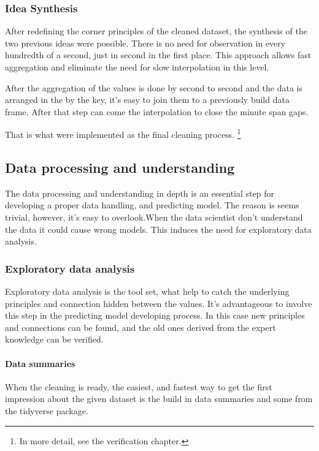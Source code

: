 		\subsubsection{Idea Synthesis}
		After redefining the corner principles of the cleaned dataset, the synthesis of the two previous ideas were possible.
		There is no need for observation in every hundredth of a second, just in second in the first place. This approach allows fast aggregation and eliminate the need for slow interpolation in this level.

		After the aggregation of the values is done by second to second and the data is arranged in the by the key, it's easy to join them to a previously build data frame. After that step can come the interpolation to close the minute span gaps.

		That is what were implemented as the final cleaning process. \footnote{In more detail, see the verification chapter.}
\subsection{Data processing and understanding}
		The data processing and understanding in depth is an essential step for developing a proper data handling, and predicting model.
		The reason is seems trivial, however, it's easy to overlook.When the data scientist don't understand the data it could cause wrong models. This induces the need for exploratory data analysis.
	\subsubsection{Exploratory data analysis}
		Exploratory data analysis is the tool set, what help to catch the underlying principles and connection hidden between the values. It's advantageous to involve this step in the predicting model developing process. In this case new principles and connections can be found, and the old ones derived from the expert knowledge can be verified.
		\paragraph{Data summaries}
		When the cleaning is ready, the easiest, and fastest way to get the first impression about the given dataset is the build in data summaries and some from the tidyverse package.


